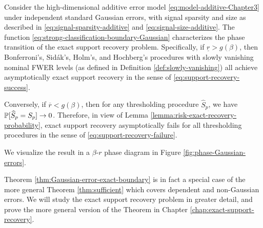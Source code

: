 \begin{theorem} \label{thm:Gaussian-error-exact-boundary}
Consider the high-dimensional additive error model \eqref{eq:model-additive-Chapter3} under independent standard Gaussian errors, with signal sparsity and size as described in \eqref{eq:signal-sparsity-additive} and \eqref{eq:signal-size-additive}.
The function \eqref{eq:strong-classification-boundary-Gaussian} characterizes the phase transition of the exact support recovery problem.
Specifically, if $\underline{r} > {{g}}(\beta)$, then Bonferroni's, Sid\'ak's, Holm's, and Hochberg's procedures with slowly vanishing  nominal FWER levels (as defined in Definition \ref{def:slowly-vanishing}) all achieve asymptotically exact support recovery in the sense of \eqref{eq:support-recovery-success}. 

Conversely, if $\overline{r} < {{g}}(\beta)$, then for any thresholding procedure $\widehat{S}_p$, we have $\P[\widehat{S}_p=S_p]\to0$.
Therefore, in view of Lemma \ref{lemma:risk-exact-recovery-probability}, exact support recovery asymptotically fails for all thresholding procedures in the sense of \eqref{eq:support-recovery-failure}.
\end{theorem}

We visualize the result in a $\beta$-$r$ phase diagram in Figure \ref{fig:phase-Gaussian-errors}.

Theorem \ref{thm:Gaussian-error-exact-boundary} is in fact a special case of the more general Theorem \ref{thm:sufficient} which covers dependent and non-Gaussian errors.
We will study the exact support recovery problem in greater detail, and prove the more general version of the Theorem in Chapter \ref{chap:exact-support-recovery}. 

